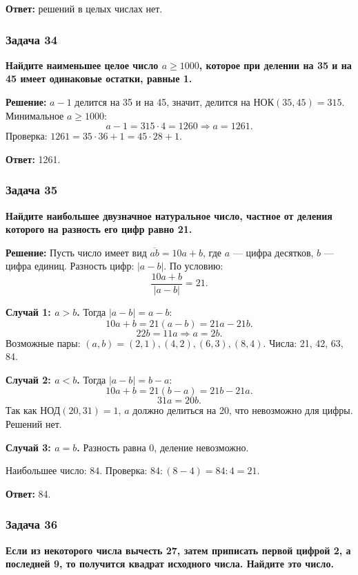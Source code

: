 \documentclass[12pt, a4paper]{article}
\begin{document}
\textbf{Ответ:} решений в целых числах нет.

\subsubsection*{Задача 34}
\textbf{Найдите наименьшее целое число $a \ge 1000$, которое при делении на 35 и на 45 имеет одинаковые остатки, равные 1.}

\textbf{Решение:}
$a - 1$ делится на 35 и на 45, значит, делится на НОК$(35, 45) = 315$. Минимальное $a \ge 1000$:
\[
a - 1 = 315 \cdot 4 = 1260 \Rightarrow a = 1261.
\]
Проверка: $1261 = 35 \cdot 36 + 1 = 45 \cdot 28 + 1$.

\textbf{Ответ:} 1261.

\subsubsection*{Задача 35}
\textbf{Найдите наибольшее двузначное натуральное число, частное от деления которого на разность его цифр равно 21.}

\textbf{Решение:}
Пусть число имеет вид $\overline{ab} = 10a + b$, где $a$ — цифра десятков, $b$ — цифра единиц. Разность цифр: $|a - b|$. По условию:
\[
\frac{10a+b}{|a-b|} = 21.
\]

\textbf{Случай 1: $a > b$.} Тогда $|a-b| = a-b$:
\[
10a + b = 21(a-b) = 21a - 21b.
\]
\[
22b = 11a \Rightarrow a = 2b.
\]
Возможные пары: $(a, b) = (2, 1), (4, 2), (6, 3), (8, 4)$. Числа: 21, 42, 63, 84.

\textbf{Случай 2: $a < b$.} Тогда $|a-b| = b-a$:
\[
10a + b = 21(b-a) = 21b - 21a.
\]
\[
31a = 20b.
\]
Так как $\text{НОД}(20, 31) = 1$, $a$ должно делиться на 20, что невозможно для цифры. Решений нет.

\textbf{Случай 3: $a = b$.} Разность равна 0, деление невозможно.

Наибольшее число: $84$. Проверка: $84 : (8-4) = 84 : 4 = 21$.

\textbf{Ответ:} 84.

\subsubsection*{Задача 36}
\textbf{Если из некоторого числа вычесть 27, затем приписать первой цифрой 2, а последней 9, то получится квадрат исходного числа. Найдите это число.}
\end{document}
